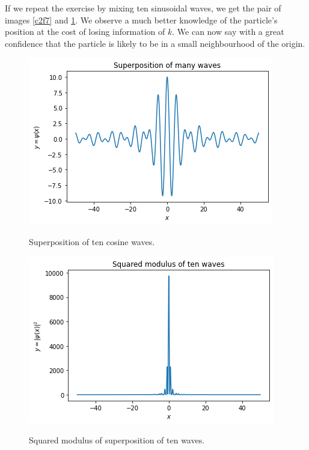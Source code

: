 If we repeat the exercise by mixing ten sinusoidal waves, we get the pair of
images \ref{c2f7} and \ref{c2f8}. We observe a much better knowledge of the
particle's position at the cost of losing information of $k$. We can now say
with a great confidence that the particle is likely to be in a small 
neighbourhood of the origin. 
\begin{figure}
\begin{center}
\includegraphics[scale=0.5]{ten-waves}
\caption{Superposition of ten cosine waves.}\label{c2f7}
\includegraphics[scale=0.5]{ten-waves-sq}
\caption{Squared modulus of superposition of ten waves.}\label{c2f8}
\end{center}
\end{figure}

